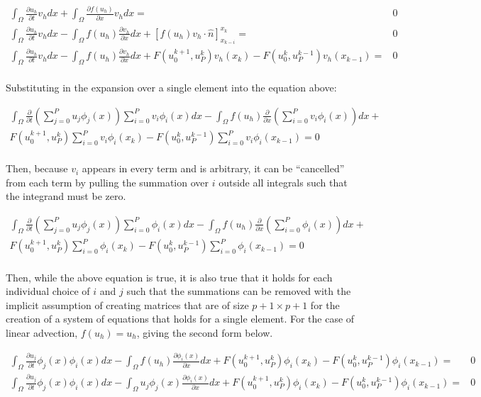 \documentclass[10pt]{article}
\newcommand{\beqa}{\begin{equation}\begin{aligned}}
\newcommand{\eeqa}{\end{aligned}\end{equation}}
\begin{document}
\beqa
\int_{\Omega}\frac{\partial u_h}{\partial t}v_hdx+\int_{\Omega}\frac{\partial f(u_h)}{\partial x}v_hdx=&0\\
\int_{\Omega}\frac{\partial u_h}{\partial t}v_hdx-\int_{\Omega}f(u_h)\frac{\partial v_h}{\partial x}dx+\left\lbrack f(u_h)v_h\cdot\hat{n}\right\rbrack_{x_{k-i}}^{x_k}=&0\\
\int_{\Omega}\frac{\partial u_h}{\partial t}v_hdx-\int_{\Omega}f(u_h)\frac{\partial v_h}{\partial x}dx+F(u_0^{k+1}, u_P^k)v_h(x_{k})-F(u_0^k, u_P^{k-1})v_h(x_{k-1})=&0\\
\eeqa

Substituting in the expansion over a single element into the equation above:

\beqa
\int_{\Omega}\frac{\partial}{\partial t}\left(\sum_{j=0}^{P}u_j\phi_j(x)\right)\sum_{i=0}^{P}v_i\phi_i(x)dx-\int_{\Omega}f(u_h)\frac{\partial}{\partial x}\left(\sum_{i=0}^{P}v_i\phi_i(x)\right)dx+\quad\\
F(u_0^{k+1}, u_P^k)\sum_{i=0}^{P}v_i\phi_i(x_{k})-F(u_0^k, u_P^{k-1})\sum_{i=0}^{P}v_i\phi_i(x_{k-1})=0\\
\eeqa

Then, because \(v_i\) appears in every term and is arbitrary, it can be ``cancelled'' from each term by pulling the summation over \(i\) outside all integrals such that the integrand must be zero.

\beqa
\int_{\Omega}\frac{\partial}{\partial t}\left(\sum_{j=0}^{P}u_j\phi_j(x)\right)\sum_{i=0}^{P}\phi_i(x)dx-\int_{\Omega}f(u_h)\frac{\partial}{\partial x}\left(\sum_{i=0}^{P}\phi_i(x)\right)dx+\quad\\
F(u_0^{k+1}, u_P^k)\sum_{i=0}^{P}\phi_i(x_{k})-F(u_0^k, u_P^{k-1})\sum_{i=0}^{P}\phi_i(x_{k-1})=0\\
\eeqa

Then, while the above equation is true, it is also true that it holds for each individual choice of \(i\) and \(j\) such that the summations can be removed with the implicit assumption of creating matrices that are of size \(p+1\times p+1\) for the creation of a system of equations that holds for a single element. For the case of linear advection, \(f(u_h)=u_h\), giving the second form below.

\beqa
\int_{\Omega}\frac{\partial u_j}{\partial t}\phi_j(x)\phi_i(x)dx-\int_{\Omega}f(u_h)\frac{\partial \phi_i(x)}{\partial x}dx+F(u_0^{k+1}, u_P^k)\phi_i(x_{k})-F(u_0^k, u_P^{k-1})\phi_i(x_{k-1})=&0\\
\int_{\Omega}\frac{\partial u_j}{\partial t}\phi_j(x)\phi_i(x)dx-\int_{\Omega}u_j\phi_j(x)\frac{\partial \phi_i(x)}{\partial x}dx+F(u_0^{k+1}, u_P^k)\phi_i(x_{k})-F(u_0^k, u_P^{k-1})\phi_i(x_{k-1})=&0\\
\eeqa
\end{document}
